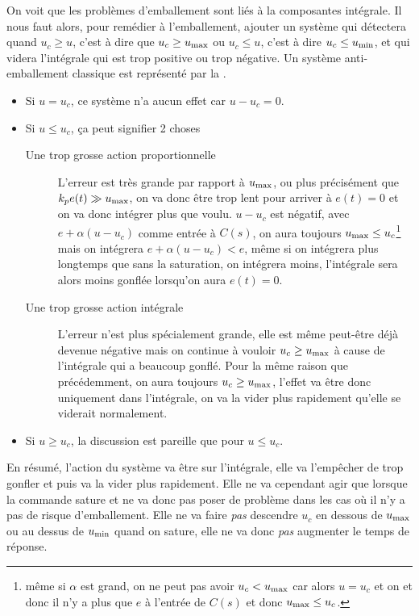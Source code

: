 On voit que les problèmes d'emballement sont liés à la composantes intégrale.
Il nous faut alors, pour remédier à l'emballement, ajouter un système qui détectera quand
$u_c \geq u$, c'est à dire que $u_c \geq u_\mathrm{max}$ ou $u_c \leq u$, c'est à dire $u_c \leq u_\mathrm{min}$,
et qui videra l'intégrale qui est trop positive ou trop négative.
Un système anti-emballement classique est représenté par la .

\begin{itemize}
  \item Si $u = u_c$, ce système n'a aucun effet car $u - u_c = 0$.
  \item Si $u \leq u_c$, ça peut signifier 2 choses
    \begin{description}
      \item[Une trop grosse action proportionnelle]
        L'erreur est très grande par rapport à $u_\mathrm{max}$, ou plus précisément que $k_p e(t) \gg u_\mathrm{max}$,
        on va donc être trop lent pour arriver à $e(t) = 0$ et on va donc intégrer plus que voulu.
        $u - u_c$ est négatif, avec $e + \alpha (u-u_c)$ comme entrée à $C(s)$,
        on aura toujours $u_\mathrm{max} \leq u_c$\footnote{même si $\alpha$ est grand, on ne peut pas avoir $u_c < u_\mathrm{max}$ car alors $u = u_c$ et on et donc il n'y a plus que $e$ à l'entrée de $C(s)$ et donc $u_\mathrm{max} \leq u_c$.}
        mais on intégrera $e + \alpha (u-u_c) < e$, même si on intégrera plus longtemps que sans la saturation, on intégrera moins,
        l'intégrale sera alors moins gonflée lorsqu'on aura $e(t) = 0$.
      \item[Une trop grosse action intégrale]
        L'erreur n'est plus spécialement grande, elle est même peut-être déjà devenue négative mais
        on continue à vouloir $u_c \geq u_\mathrm{max}$ à cause de l'intégrale qui a beaucoup gonflé.
        Pour la même raison que précédemment, on aura toujours $u_c \geq u_\mathrm{max}$,
        l'effet va être donc uniquement dans l'intégrale, on va la vider plus rapidement qu'elle se viderait normalement.
    \end{description}
  \item Si $u \geq u_c$, la discussion est pareille que pour $u \leq u_c$.
\end{itemize}
En résumé, l'action du système va être sur l'intégrale, elle va l'empêcher de trop gonfler et puis va la vider plus rapidement.
Elle ne va cependant agir que lorsque la commande sature et ne va donc pas poser de problème dans les cas où il n'y a pas de risque
d'emballement.
Elle ne va faire \emph{pas} descendre $u_c$ en dessous de $u_\mathrm{max}$ ou au dessus de $u_\mathrm{min}$ quand on sature,
elle ne va donc \emph{pas} augmenter le temps de réponse.

